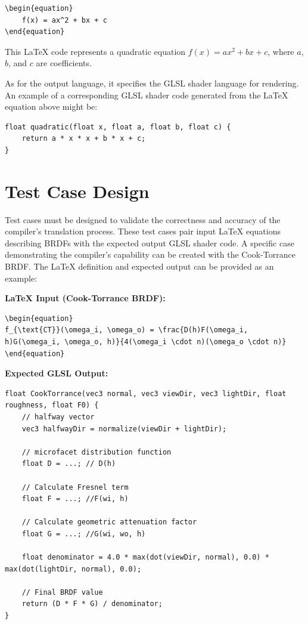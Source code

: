\documentclass[english, 
               brazil, 
               bsc] %
               {dcomp-abntex2}
\begin{document}
\begin{verbatim}
\begin{equation}
    f(x) = ax^2 + bx + c
\end{equation}
\end{verbatim}

This LaTeX code represents a quadratic equation \( f(x) = ax^2 + bx + c \), where \( a \), \( b \), and \( c \) are coefficients.

As for the output language, it specifies the GLSL shader language for rendering. An example of a corresponding GLSL shader code generated from the LaTeX equation above might be:

\begin{verbatim}
float quadratic(float x, float a, float b, float c) {
    return a * x * x + b * x + c;
}
\end{verbatim}

\section{Test Case Design}

Test cases must be designed to validate the correctness and accuracy of the compiler's translation process. These test cases pair input LaTeX equations describing BRDFs with the expected output GLSL shader code. A specific case demonstrating the compiler's capability can be created with the Cook-Torrance BRDF. The LaTeX definition and expected output can be provided as an example:

\textbf{LaTeX Input (Cook-Torrance BRDF):}
\begin{verbatim}
\begin{equation}
f_{\text{CT}}(\omega_i, \omega_o) = \frac{D(h)F(\omega_i, h)G(\omega_i, \omega_o, h)}{4(\omega_i \cdot n)(\omega_o \cdot n)}
\end{equation}
\end{verbatim}

\textbf{Expected GLSL Output:}
\begin{verbatim}
float CookTorrance(vec3 normal, vec3 viewDir, vec3 lightDir, float roughness, float F0) {
    // halfway vector
    vec3 halfwayDir = normalize(viewDir + lightDir);

    // microfacet distribution function
    float D = ...; // D(h)

    // Calculate Fresnel term
    float F = ...; //F(wi, h) 

    // Calculate geometric attenuation factor
    float G = ...; //G(wi, wo, h)

    float denominator = 4.0 * max(dot(viewDir, normal), 0.0) * max(dot(lightDir, normal), 0.0);

    // Final BRDF value
    return (D * F * G) / denominator;
}
\end{verbatim}
\end{document}
